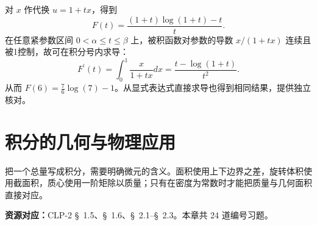 \documentclass[12pt,fontset=fandol]{ctexart}
\begin{document}
\begin{solve}\label{ans:c20q24}
对 $x$ 作代换 $u=1+tx$，得到
\[
F(t)=\frac{(1+t)\log(1+t)-t}{t}.
\]
在任意紧参数区间 $0<\alpha\le t\le\beta$ 上，被积函数对参数的导数 $x/(1+tx)$ 连续且被1控制，故可在积分号内求导：
\[
F^{\prime}(t)=\int_0^1\frac{x}{1+tx}dx=\frac{t-\log(1+t)}{t^2}.
\]
从而 $F(6)=\frac{7}{6}\log(7)-1$。从显式表达式直接求导也得到相同结果，提供独立核对。
\end{solve}

\clearpage
\section{积分的几何与物理应用}\label{sec:ch21}
把一个总量写成积分，需要明确微元的含义。面积使用上下边界之差，旋转体积使用截面积，质心使用一阶矩除以质量；只有在密度为常数时才能把质量与几何面积直接对应。

\textbf{资源对应：}CLP-2 \S~1.5、\S~1.6、\S~2.1--\S~2.3。本章共 24 道编号习题。
\end{document}
